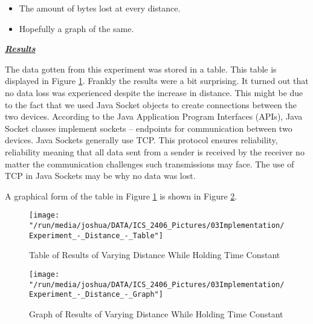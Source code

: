 \documentclass[12pt,svgnames,smaller]{article} %
\begin{document}
		\begin{itemize}
			\item The amount of bytes lost at every distance.
			\item Hopefully a graph of the same.
		\end{itemize}
		
		
	\textbf{\textit{\underline{Results}}}
	
	The data gotten from this experiment was stored in a table. This table is displayed in Figure \ref{fig:Implementation-Figure17}. Frankly the results were a bit surprising. It turned out that no data loss was experienced despite the increase in distance. This might be due to the fact that we used Java Socket objects to create connections between the two devices. According to the Java Application Program Interfaces (APIs), Java Socket classes implement sockets – endpoints  for communication between two devices. Java Sockets generally use TCP. This protocol ensures reliability, reliability meaning that all data sent from a sender is received by the receiver no matter the communication challenges such transmissions may face. The use of TCP in Java Sockets may be why no data was lost.
	
	A graphical form of the table in Figure \ref{fig:Implementation-Figure17} is shown in Figure \ref{fig:Implementation-Figure18}.
	
	\begin{figure}
		\centering
		\texttt{[image: "/run/media/joshua/DATA/ICS\_2406\_Pictures/03Implementation/Experiment\_-\_Distance\_-\_Table"]}
		\caption{Table of Results of Varying Distance While Holding Time Constant}
		\label{fig:Implementation-Figure17}			
	\end{figure} 
	
	\begin{figure}
		\centering
		\texttt{[image: "/run/media/joshua/DATA/ICS\_2406\_Pictures/03Implementation/Experiment\_-\_Distance\_-\_Graph"]}
		\caption{Graph of Results of Varying Distance While Holding Time Constant}
		\label{fig:Implementation-Figure18}			
	\end{figure} 
	
\end{document}
